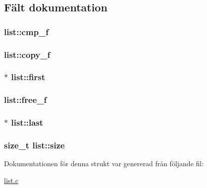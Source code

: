 \subsection{Fält dokumentation}
\subsubsection[{\texorpdfstring{cmp\+\_\+f}{cmp_f}}]{ list\+::cmp\+\_\+f}\hypertarget{structlist_a3e595459af1efe57e5929c7a48c1cb1c}{}\label{structlist_a3e595459af1efe57e5929c7a48c1cb1c}
\subsubsection[{\texorpdfstring{copy\+\_\+f}{copy_f}}]{ list\+::copy\+\_\+f}\hypertarget{structlist_acd5def2fe519248ad24e10b426acd44f}{}\label{structlist_acd5def2fe519248ad24e10b426acd44f}
\subsubsection[{\texorpdfstring{first}{first}}]{$\ast$ list\+::first}\hypertarget{structlist_a8b3138e762449dc038dfa560f02f5f96}{}\label{structlist_a8b3138e762449dc038dfa560f02f5f96}
\subsubsection[{\texorpdfstring{free\+\_\+f}{free_f}}]{ list\+::free\+\_\+f}\hypertarget{structlist_a28ae85a352de920c1bcc353411bac5fe}{}\label{structlist_a28ae85a352de920c1bcc353411bac5fe}
\subsubsection[{\texorpdfstring{last}{last}}]{$\ast$ list\+::last}\hypertarget{structlist_a05a1dc6800f93b4e20b872a397ab396f}{}\label{structlist_a05a1dc6800f93b4e20b872a397ab396f}
\subsubsection[{\texorpdfstring{size}{size}}]{\setlength{\rightskip}{0pt plus 5cm}size\+\_\+t list\+::size}\hypertarget{structlist_ae581be90bd8eb7051528b61ad216de88}{}\label{structlist_ae581be90bd8eb7051528b61ad216de88}


Dokumentationen för denna strukt var genererad från följande fil\+:\begin{DoxyCompactItemize}
\item 
\hyperlink{list_8c}{list.\+c}\end{DoxyCompactItemize}

